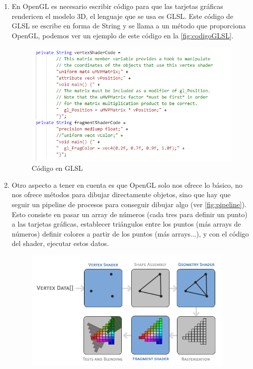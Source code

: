 \begin{enumerate}
    
    \item En OpenGL es necesario escribir código para que las tarjetas gráficas rendericen el modelo 3D,
    el lenguaje que se usa es GLSL. Este código de GLSL se escribe en forma de String y se llama a un método 
    que proporciona OpenGL, podemos ver un ejemplo de este código en la \autoref{fig:codigoGLSL}.
    \begin{figure}[H]
        \centering
        \includegraphics[width=5in]{figures/GLSL.png}
        \caption{Código en GLSL}
        \label{fig:codigoGLSL}
    \end{figure}
    \newpage    
    \item Otro aspecto a tener en cuenta es que OpenGL solo nos ofrece lo básico, no nos ofrece métodos para dibujar 
    directamente objetos, sino que hay que seguir un pipeline de procesos para conseguir dibujar algo (ver \autoref{fig:pipeline}).
    Esto consiste en pasar un array de números (cada tres para definir un punto) 
    a las tarjetas gráficas, establecer triángulos entre los puntos (más arrays de números) 
    definir colores a partir de los puntos (más arrays...), y con el código del shader, ejecutar 
    estos datos.
    \begin{figure}
        \centering
        \includegraphics[width=4in]{figures/pipeline.png}

\end{figure}
\end{enumerate}
